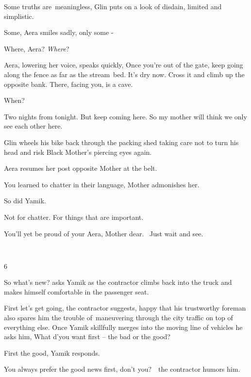 \documentclass[twoside,11pt]{book}
\begin{document}
{\textquotedbl}Some truths are~meaningless,{\textquotedbl} Glin puts on a look of disdain, {\textquotedbl}limited and
simplistic.{\textquotedbl}\ 

{\textquotedbl}Some,{\textquotedbl} Aera smiles sadly, {\textquotedbl}only some -{\textquotedbl}~ 

{\textquotedbl}Where, Aera? \textit{Where}?{\textquotedbl}

Aera, lowering her voice, speaks quickly, {\textquotedbl}Once you're out of the gate, keep going along the fence as far
as the stream\ bed. It's dry now. Cross it and climb up the opposite bank. There, facing you, is a
cave.{\textquotedbl}\ 

{\textquotedbl}When?{\textquotedbl}

{\textquotedbl}Two nights from tonight. But keep coming here. So my mother will think we only see each other
here.{\textquotedbl}

Glin wheels his bike back through the packing shed taking care not to turn his head and risk Black Mother's piercing
eyes again.

Aera resumes her post opposite Mother at the belt. 

{\textquotedbl}You learned to chatter in their language,{\textquotedbl} Mother admonishes her.

{\textquotedbl}So did Yamik.{\textquotedbl}

{\textquotedbl}Not for chatter. For things that are important.{\textquotedbl}

{\textquotedbl}You'll yet be proud of your Aera, Mother dear.~ Just wait and see.{\textquotedbl}

~

6 

{\textquotedbl}So what's new?{\textquotedbl} asks Yamik as the contractor climbs back into the truck and makes himself
comfortable in the passenger seat. 

{\textquotedbl}First let's get going,{\textquotedbl} the contractor suggests, happy that his trustworthy foreman also
spares him the trouble of\ maneuvering through the city traffic on top of everything else. Once Yamik skillfully merges
into the moving line of vehicles he asks him, {\textquotedbl}What d'you want first -- the bad or the
good?{\textquotedbl} 

{\textquotedbl}First the good,{\textquotedbl} Yamik responds. 

{\textquotedbl}You always prefer the good news first, don't you?{\textquotedbl}\ \ the contractor humors him. 
\end{document}
